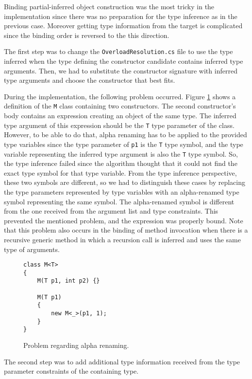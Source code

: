 Binding partial-inferred object construction was the most tricky in the implementation since there was no preparation for the type inference as in the previous case. 
Moreover getting type information from the target is complicated since the binding order is reversed to the this direction.
\par
The first step was to change the \texttt{OverloadResolution.cs} file to use the
type inferred when the type defining the constructor candidate contains inferred type arguments. 
Then, we had to substitute the constructor signature with inferred type arguments and choose the constructor that best fits.
\par
During the implementation, the following problem occurred. 
Figure \ref{img70:alpha} shows a definition of the \texttt{M} class containing two constructors. 
The second constructor’s body contains an expression creating an object of the same type. 
The inferred type argument of this expression should be the \texttt{T} type parameter of the class. 
However, to be able to do that, alpha renaming has to be applied to the provided type variables since the type parameter of \texttt{p1} is the \texttt{T} type symbol, and the type variable representing the inferred type argument is also the \texttt{T} type symbol. 
So, the type inference failed since the algorithm thought that it could not find the exact type symbol for that type variable. 
From the type inference perspective, these two symbols are different, so we had to distinguish these cases by replacing the type parameters represented by type variables with an alpha-renamed type symbol representing the same symbol. 
The alpha-renamed symbol is different from the one received from the argument list and type constraints. 
This prevented the mentioned problem, and the expression was properly bound. 
Note that this problem also occurs in the binding of method invocation when there is a recursive generic method in which a recursion call is inferred and uses the same type of arguments.
\begin{figure}[h]
\begin{lstlisting}[style=csharp, showstringspaces=false]
class M<T> 
{
    M(T p1, int p2) {}
    
    M(T p1) 
    {
        new M<_>(p1, 1);
    }
}
\end{lstlisting}
\caption{Problem regarding alpha renaming.}
\label{img70:alpha}
\end{figure}
\par
The second step was to add additional type information received from the type parameter constraints of the containing type.
